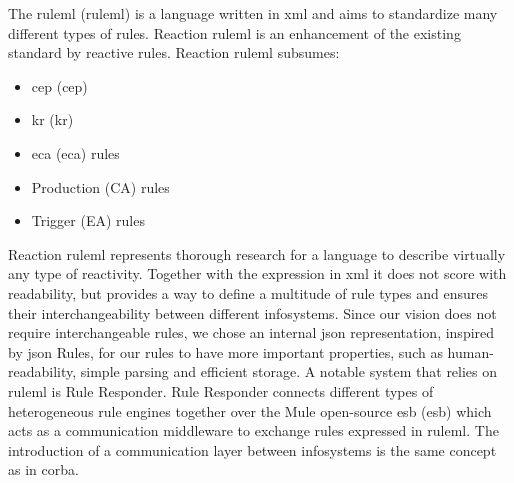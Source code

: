 The \textrm{\acrlong{ruleml} (\acrshort{ruleml})}\cite{2006-Boley-RuleML.pdf} is a language written in \textrm{\acrshort{xml}} and aims to standardize many different types of rules.
\textrm{Reaction \acrshort{ruleml}}\cite{2012-Paschke_etal-ReactionRuleML.pdf} is an enhancement of the existing standard by reactive rules.
\textrm{Reaction \acrshort{ruleml}} subsumes:
\begin{itemize}
  \item \textrm{\acrlong{cep} (\acrshort{cep})}
  \item \textrm{\acrlong{kr} (\acrshort{kr})}
  \item \textrm{\acrlong{eca} (\acrshort{eca})} rules
  \item Production (\textrm{CA}) rules
  \item Trigger (\textrm{EA}) rules
\end{itemize}
\textrm{Reaction \acrshort{ruleml}} represents thorough research for a language to describe virtually any type of reactivity.
Together with the expression in \textrm{\acrshort{xml}} it does not score with readability, but provides a way to define a multitude of rule types and ensures their interchangeability between different \textrm{\glspl{infosystem}}.
Since our vision does not require interchangeable rules, we chose an internal \textrm{\acrshort{json}} representation, inspired by \textrm{\acrshort{json} Rules}, for our rules to have more important properties, such as human-readability, simple parsing and efficient storage.
A notable system that relies on \textrm{\acrshort{ruleml}} is \textrm{Rule Responder}\cite{2007-Paschke_etal-RuleResponder.pdf}.
\textrm{Rule Responder} connects different types of heterogeneous rule engines together over the \textrm{Mule} open-source \textrm{\acrlong{esb} (\acrshort{esb})} which acts as a communication middleware to exchange rules expressed in \textrm{\acrshort{ruleml}}.
The introduction of a communication layer between \textrm{\glspl{infosystem}} is the same concept as in \textrm{\acrshort{corba}}.


